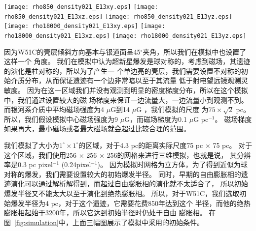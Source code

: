 \begin{figure*}
    \centering
    \texttt{[image: rho850\_density021\_E13xy.eps]}
    \texttt{[image: rho850\_density021\_E13xz.eps]}
    \texttt{[image: rho850\_density021\_E13yz.eps]}\newline
    \texttt{[image: rho18000\_density021\_E13xy.eps]}
    \texttt{[image: rho18000\_density021\_E13xz.eps]}
    \texttt{[image: rho18000\_density021\_E13yz.eps]}
    \caption{模拟的密度-磁场图像。所有的图都是沿着一个三维立体图像沿着中心切片后得到的
    从不同方向看的结果。背景彩色图像是密度分布，白色箭头显示了磁场的方向和强度。上面三幅
    显示的是初始条件，下面三幅显示了经过18000年演化后的结果。上面三幅图中，中心磁场的强度
    是9$\mu G$。}
\label{fig:simulation}
\end{figure*}

因为W51C的壳层倾斜方向基本与银道面呈45$^{\circ}$夹角，所以我们在模拟中也设置了这样一个
角度。
我们在模拟中认为超新星爆发是球对称的，考虑到磁场，其遗迹的演化是柱对称的，所以为了产生一
个单边亮的壳层，我们需要设置不对称的初始介质分布，从而保证遗迹有一个边非常暗以至于其流量
低于射电望远镜观测灵敏度。
因为在这一区域我们并没有观测到明显的密度梯度分布，所以在这个模拟中，我们通过设置较大的磁
场梯度来保证一边流量大，一边流量小到观测不到。
而银河系介质中平均磁场强度为4 $\mu$G到14 $\mu$G \citep{Haverkorn2015}，我们模拟的尺度
为$75 \times \sqrt{2}$ pc。
所以，我们假设模拟中心磁场强度为9 $\mu$G，而磁场梯度为0.1 $\mu$G pc$^{-1}$。
磁场梯度如果再大，最小磁场或者最大磁场就会超过比较合理的范围。

我们模拟了大小为$1^\circ \times 1^\circ$的区域，对于4.3 pc的距离实际尺度75 pc $\times$
75 pc。
对于这个区域，我们使用256 $\times$ 256 $\times$ 256的网格来进行三维模拟，也就是说，
其分辨率是0.3 pc pixel$^{-1}$ (0.24\am pixel$^{-1}$)。
因为模拟时网格为立方体，为了得到近似为球对称的爆发，我们需要设置较大的初始爆发半径。
同时，早期的自由膨胀相的遗迹演化可以通过解析解得到，而超过自由膨胀相的演化就不太适合了，
所以初始爆发半径又不能太大以至于演化到绝热膨胀相。
所以，对于W51C，我们选取初始爆发半径为4 pc，对于这个遗迹，它需要花费850年达到这个
半径，而他的绝热膨胀相起始于3200年\citep{Leahy2017a}，所以它达到初始半径时仍处于自由
膨胀相。
在图~\ref{fig:simulation}中，上面三幅图展示了模拟中采用的初始条件。

